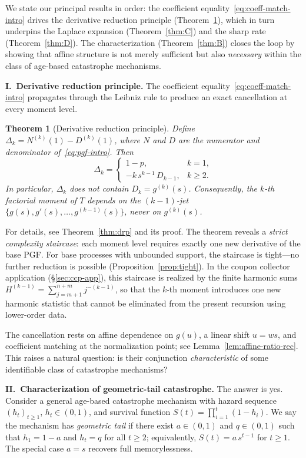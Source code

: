 \documentclass[11pt]{article}
\theoremstyle{plain}
\newtheorem{theorem}{Theorem}[section]
\theoremstyle{definition}
\theoremstyle{remark}
\begin{document}
We state our principal results in order: the coefficient equality~\eqref{eq:coeff-match-intro} drives the derivative reduction principle (Theorem~\ref{thm:A}), which in turn underpins the Laplace expansion (Theorem~\ref{thm:C}) and the sharp rate (Theorem~\ref{thm:D}).  The characterization (Theorem~\ref{thm:B}) closes the loop by showing that affine structure is not merely sufficient but also \emph{necessary} within the class of age-based catastrophe mechanisms.

\medskip
\noindent\textbf{I.\ Derivative reduction principle.}
The coefficient equality~\eqref{eq:coeff-match-intro} propagates through the Leibniz rule to produce an exact cancellation at every moment level.

\begin{theorem}[Derivative reduction principle]\label{thm:A}
Define $\Delta_k = N^{(k)}(1) - D^{(k)}(1)$, where $N$ and $D$ are the numerator and denominator of~\eqref{eq:pgf-intro}.  Then
\[
  \Delta_k =
  \begin{cases}
    1-p, & k=1, \\
    -k\,s^{k-1}\,D_{k-1}, & k \geq 2.
  \end{cases}
\]
In particular, $\Delta_k$ does not contain $D_k = g^{(k)}(s)$.  Consequently, the $k$-th factorial moment of $T$ depends on the $(k{-}1)$-jet $\{g(s), g'(s), \ldots, g^{(k-1)}(s)\}$, never on $g^{(k)}(s)$.
\end{theorem}

For details, see Theorem~\ref{thm:drp} and its proof. The theorem reveals a \emph{strict complexity staircase}: each moment level requires exactly one new derivative of the base PGF. For base processes with unbounded support, the staircase is tight---no further reduction is possible (Proposition~\ref{prop:tight}). In the coupon collector application (\S\ref{sec:ccp-app}), this staircase is realized by the finite harmonic sums $H^{(k-1)}=\sum_{j=m+1}^{n+m} j^{-(k-1)}$, so that the $k$-th moment introduces one new harmonic statistic that cannot be eliminated from the present recursion using lower-order data.

The cancellation rests on affine dependence on $g(u)$, a linear shift $u=ws$, and coefficient matching at the normalization point; see Lemma~\ref{lem:affine-ratio-rec}.  This raises a natural question: is their conjunction \emph{characteristic} of some identifiable class of catastrophe mechanisms?

\medskip
\noindent\textbf{II.\ Characterization of geometric-tail catastrophe.}
The answer is yes.  Consider a general age-based catastrophe mechanism with hazard sequence $(h_t)_{t \geq 1}$, $h_t \in (0,1)$, and survival function $S(t) = \prod_{i=1}^{t}(1-h_i)$.  We say the mechanism has \emph{geometric tail} if there exist $a \in (0,1)$ and $q \in (0,1)$ such that $h_1 = 1-a$ and $h_t = q$ for all $t \geq 2$; equivalently, $S(t) = a\,s^{t-1}$ for $t \geq 1$.  The special case $a = s$ recovers full memorylessness.
\end{document}
